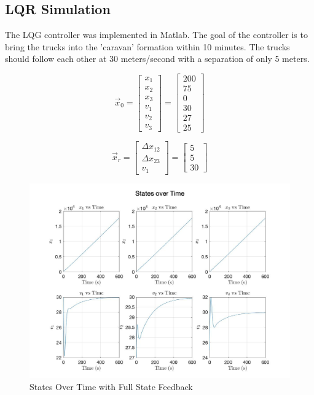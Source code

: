 \documentclass[12pt,onecolumn,reqno]{amsart}
\begin{document}
\subsection{LQR Simulation}
The LQG controller was implemented in Matlab. The goal of the controller is to
bring the trucks into the 'caravan' formation within 10 minutes. The trucks
should follow each other at 30 meters/second with a separation of only 5 meters.

\begin{equation*}
 \vec{x}_{0} = 
  \begin{bmatrix}
    x_{1} \\
    x_{2} \\
    x_{3} \\
    v_{1} \\
    v_{2} \\
    v_{3}
  \end{bmatrix} 
  =
  \begin{bmatrix}
    200 \\
    75 \\
    0 \\
    30 \\
    27 \\
    25
  \end{bmatrix} 
\end{equation*}

\begin{equation*}
  \vec{x}_{r} = 
  \begin{bmatrix}
    \Delta x_{12} \\ 
    \Delta x_{23} \\ 
    v_{1}
  \end{bmatrix} 
  =
  \begin{bmatrix}
    5 \\
    5 \\
    30
  \end{bmatrix} 
\end{equation*}

\begin{figure}[H]
	\includegraphics[width=\linewidth]{states_over_time_with_truth.jpg}
	\caption{States Over Time with Full State Feedback}
\end{figure}
\end{document}
